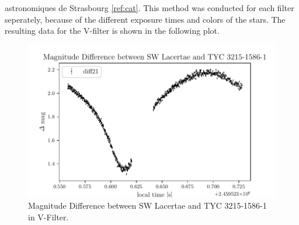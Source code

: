   astronomiques de Strasbourg \ref{ref:cat}.
  This method was conducted for each filter seperately, because of the different 
  exposure times and colors of the stars.
  The resulting data for the V-filter is shown in the following plot.
  \begin{figure}[H]
    \centering
    \includegraphics{V-Filter.pdf}
    \caption{Magnitude Difference between SW Lacertae and TYC 3215-1586-1 in V-Filter.}
    \label{fig:plot}
  \end{figure}


